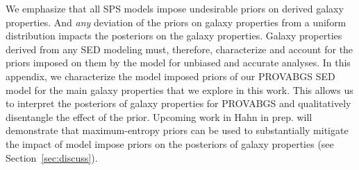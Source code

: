 We emphasize that all SPS models impose undesirable priors on derived galaxy
properties. 
And \emph{any} deviation of the priors on galaxy properties from a uniform
distribution impacts the posteriors on the galaxy properties. 
Galaxy properties derived from any SED modeling must, therefore, characterize
and account for the priors imposed on them by the model for unbiased and
accurate analyses. 
In this appendix, we characterize the model imposed priors of our PROVABGS SED
model for the main galaxy properties that we explore in this work. 
This allows us to interpret the posteriors of galaxy properties for PROVABGS
and qualitatively disentangle the effect of the prior. 
Upcoming work in Hahn in prep. will demonstrate that maximum-entropy priors can
be used to substantially mitigate the impact of model impose priors on the
posteriors of galaxy properties (see Section~\ref{sec:discuss}). 
